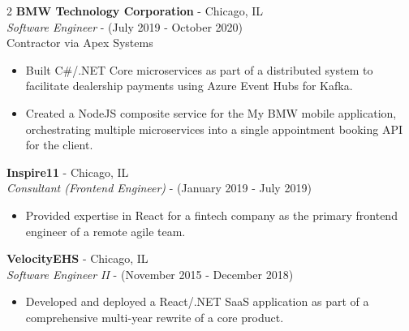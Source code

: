 \documentclass[10pt]{article}
\begin{document}
\begin{paracol}{2}
    \noindent \textbf{BMW Technology Corporation} - Chicago, IL \\
    \textit{Software Engineer} - {\footnotesize{(July 2019 - October 2020)}} \\
    {\footnotesize{Contractor via Apex Systems}}
    \begin{itemize}
        \item Built C\#/.NET Core microservices as part of a distributed system to facilitate dealership payments using Azure Event Hubs for Kafka.
        \item Created a NodeJS composite service for the My BMW mobile application, orchestrating multiple microservices into a single appointment booking API for the client.
    \end{itemize}


    \noindent \textbf{Inspire11} - Chicago, IL \\
    \textit{Consultant (Frontend Engineer)} - {\footnotesize{(January 2019 - July 2019)}}
    \begin{itemize}
        \item Provided expertise in React for a fintech company as the primary frontend engineer of a remote agile team.
    \end{itemize}

    \noindent \textbf{VelocityEHS} - Chicago, IL \\
    \textit{Software Engineer II} - {\footnotesize{(November 2015 - December 2018)}}
    \begin{itemize}
        \item Developed and deployed a React/.NET SaaS application as part of a comprehensive multi-year rewrite of a core product.
    \end{itemize}


\end{paracol}
\end{document}
